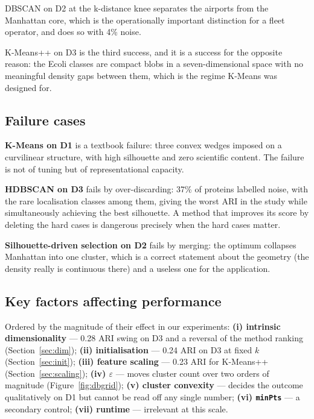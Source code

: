 \documentclass[11pt,a4paper]{article}
\begin{document}
DBSCAN on D2 at the k-distance knee separates the airports from the Manhattan
core, which is the operationally important distinction for a fleet operator, and
does so with 4\% noise.

K-Means++ on D3 is the third success, and it is a success for the opposite
reason: the Ecoli classes are compact blobs in a seven-dimensional space with no
meaningful density gaps between them, which is the regime K-Means was designed
for.

\subsection{Failure cases}
\textbf{K-Means on D1} is a textbook failure: three convex wedges imposed on a
curvilinear structure, with high silhouette and zero scientific content. The
failure is not of tuning but of representational capacity.

\textbf{HDBSCAN on D3} fails by over-discarding: 37\% of proteins labelled noise,
with the rare localisation classes among them, giving the worst ARI in the study
while simultaneously achieving the best silhouette. A method that improves its
score by deleting the hard cases is dangerous precisely when the hard cases
matter.

\textbf{Silhouette-driven selection on D2} fails by merging: the optimum collapses
Manhattan into one cluster, which is a correct statement about the geometry (the
density really is continuous there) and a useless one for the application.

\subsection{Key factors affecting performance}
Ordered by the magnitude of their effect in our experiments:
\textbf{(i) intrinsic dimensionality} --- 0.28 ARI swing on D3 and a reversal of
the method ranking (Section~\ref{sec:dim});
\textbf{(ii) initialisation} --- 0.24 ARI on D3 at fixed $k$ (Section~\ref{sec:init});
\textbf{(iii) feature scaling} --- 0.23 ARI for K-Means++ (Section~\ref{sec:scaling});
\textbf{(iv) $\varepsilon$} --- moves cluster count over two orders of magnitude
(Figure~\ref{fig:dbgrid});
\textbf{(v) cluster convexity} --- decides the outcome qualitatively on D1 but
cannot be read off any single number;
\textbf{(vi) \texttt{minPts}} --- a secondary control;
\textbf{(vii) runtime} --- irrelevant at this scale.
\end{document}
